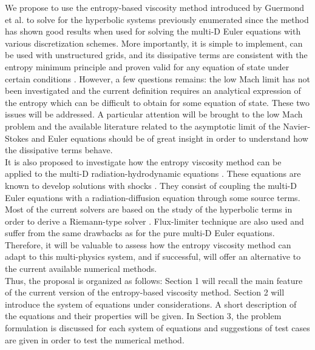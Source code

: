 We propose to use the entropy-based viscosity method introduced by Guermond et al. to solve for the hyperbolic systems previously enumerated since the method has shown good results when used for solving the multi-D Euler equations with various discretization schemes. More importantly, it is simple to implement, can be used with unstructured grids,  and its dissipative terms are consistent with the entropy minimum principle and proven valid for any equation of state under certain conditions \cite{jlg}. However, a few questions remains: the low Mach limit has not been investigated and the current definition requires an analytical expression of the entropy which can be difficult to obtain for some equation of state. These two issues will be addressed. A particular attention will be brought to the low Mach problem and the available literature related to the asymptotic limit of the Navier-Stokes \cite{Muller} and Euler equations \cite{LowMach1, LowMach2} should be of great insight in order to understand how the dissipative terms behave. \\
It is also proposed to investigate how the entropy viscosity method can be applied to the multi-D radiation-hydrodynamic equations \cite{LowrieMorelHittinger}. These equations are known to develop solutions with shocks \cite{Balsara}. They consist of coupling the multi-D Euler equations with a radiation-diffusion equation through some source terms.  Most of the current solvers are based on the study of the hyperbolic terms in order to derive a Riemann-type solver \cite{LowrieMorel}. Flux-limiter technique \cite{EdwardsMorelLowrie} are also used and suffer from the same drawbacks as for the pure multi-D Euler equations. Therefore, it will be valuable to assess how the entropy viscosity method can adapt to this multi-physics system, and if successful, will offer an alternative to the current available numerical methods.\\
Thus, the proposal is organized as follows: Section 1 will recall the main feature of the current version of the entropy-based viscosity method. Section 2 will introduce the system of equations under considerations. A short description of the equations and their properties will be given. In Section 3, the problem formulation is discussed for each system of equations and suggestions of test cases are given in order to test the numerical method.